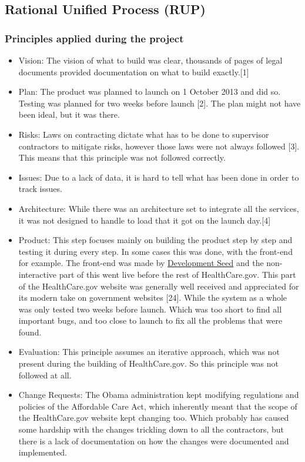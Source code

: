 \documentclass[]{article}
\begin{document}
\subsection{Rational Unified Process
(RUP)}\label{rational-unified-process-rup}

\subsubsection{Principles applied during the
project}\label{principles-applied-during-the-project-1}

\begin{itemize}
\item
  Vision: The vision of what to build was clear, thousands of pages of
  legal documents provided documentation on what to build
  exactly.{[}1{]}
\item
  Plan: The product was planned to launch on 1 October 2013 and did so.
  Testing was planned for two weeks before launch {[}2{]}. The plan
  might not have been ideal, but it was there.
\item
  Risks: Laws on contracting dictate what has to be done to supervisor
  contractors to mitigate risks, however those laws were not always
  followed {[}3{]}. This means that this principle was not followed
  correctly.
\item
  Issues: Due to a lack of data, it is hard to tell what has been done
  in order to track issues.
\item
  Architecture: While there was an architecture set to integrate all the
  services, it was not designed to handle to load that it got on the
  launch day.{[}4{]}
\item
  Product: This step focuses mainly on building the product step by step
  and testing it during every step. In some cases this was done, with
  the front-end for example. The front-end was made by
  \href{https://developmentseed.org/}{Development Seed} and the
  non-interactive part of this went live before the rest of
  HealthCare.gov. This part of the HealthCare.gov website was generally
  well received and appreciated for its modern take on government
  websites {[}24{]}. While the system as a whole was only tested two
  weeks before launch. Which was too short to find all important bugs,
  and too close to launch to fix all the problems that were found.
\item
  Evaluation: This principle assumes an iterative approach, which was
  not present during the building of HealthCare.gov. So this principle
  was not followed at all.
\item
  Change Requests: The Obama administration kept modifying regulations
  and policies of the Affordable Care Act, which inherently meant that
  the scope of the HealthCare.gov website kept changing too. Which
  probably has caused some hardship with the changes trickling down to
  all the contractors, but there is a lack of documentation on how the
  changes were documented and implemented.
\end{itemize}
\end{document}
